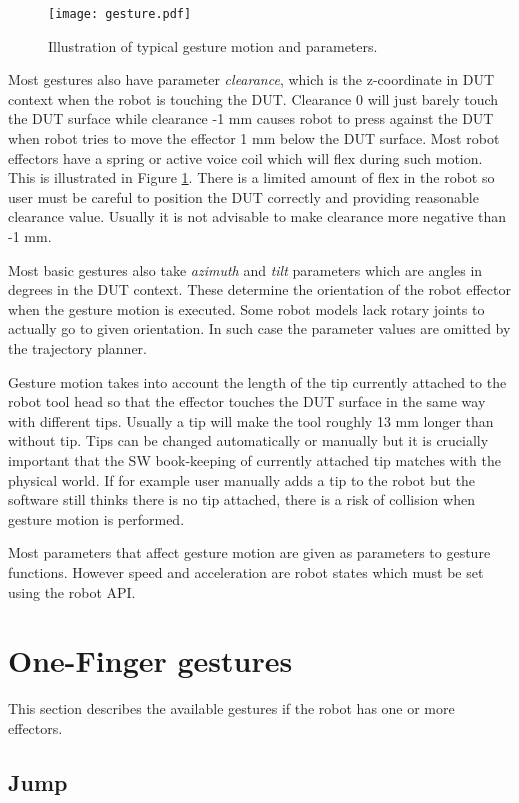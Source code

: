\begin{figure}[h]
	\centering
	\texttt{[image: gesture.pdf]}
	\caption{Illustration of typical gesture motion and parameters.}
	\label{fig:gesture}
\end{figure}

Most gestures also have parameter \emph{clearance}, which is the z-coordinate in DUT context when the robot is touching the DUT. Clearance 0 will just barely touch the DUT surface while clearance -1 mm causes robot to press against the DUT when robot tries to move the effector 1 mm below the DUT surface. Most robot effectors have a spring or active voice coil which will flex during such motion. This is illustrated in Figure \ref{fig:gesture}. There is a limited amount of flex in the robot so user must be careful to position the DUT correctly and providing reasonable clearance value. Usually it is not advisable to make clearance more negative than -1 mm.

Most basic gestures also take \emph{azimuth} and \emph{tilt} parameters which are angles in degrees in the DUT context. These determine the orientation of the robot effector when the gesture motion is executed. Some robot models lack rotary joints to actually go to given orientation. In such case the parameter values are omitted by the trajectory planner.

Gesture motion takes into account the length of the tip currently attached to the robot tool head so that the effector touches the DUT surface in the same way with different tips. Usually a tip will make the tool roughly 13 mm longer than without tip. Tips can be changed automatically or manually but it is crucially important that the SW book-keeping of currently attached tip matches with the physical world. If for example user manually adds a tip to the robot but the software still thinks there is no tip attached, there is a risk of collision when gesture motion is performed.

Most parameters that affect gesture motion are given as parameters to gesture functions. However speed and acceleration are robot states which must be set using the robot API.


\section{One-Finger gestures}
This section describes the available gestures if the robot has one or more effectors.

\subsection{Jump}

